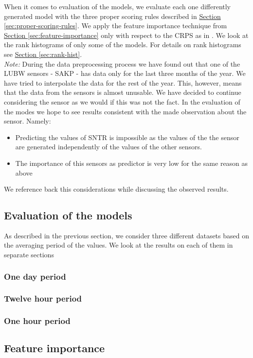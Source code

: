 \documentclass[12pt,a4paper,twoside]{scrartcl}
\numberwithin{equation}{section}
\newcommand{\refsec}[1]{\hyperref[#1]{Section \ref*{#1}}}
\begin{document}
When it comes to evaluation of the models, we evaluate each one differently generated model with the three proper scoring rules described in \refsec{sec:proper-scoring-rules}. We apply the feature importance technique from \refsec{sec:feature-importance} only with respect to the CRPS as in \cite{lerch2018}. We look at the rank histograms of only some of the models. For details on rank histograms see \refsec{sec:rank-hist}.
\\
\emph{Note:} During the data preprocessing process we have found out that one of the LUBW sensors - SAKP  - has data only for the last three months of the year. We have tried to interpolate the data for the rest of the year. This, however, means that the data from the sensors is almost unusable. We have decided to continue considering the sensor as we would if this was not the fact. In the evaluation of the modes we hope to see results consistent with the made observation about the sensor. Namely:
\begin{itemize}
\item Predicting the values of SNTR is impossible as the values of the the sensor are generated independently of the values of the other sensors.
\item The importance of this sensors as predictor is very low for the same reason as above
\end{itemize}
We reference back this considerations while discussing the observed results.

\subsection{Evaluation of the models}\label{sec:eval-model}
As described in the previous section, we consider three different datasets based on the averaging period of the values. We look at the results on each of them in separate sections
\subsubsection{One day period}
\subsubsection{Twelve hour period}
\subsubsection{One hour period}
\subsection{Feature importance}
\end{document}

